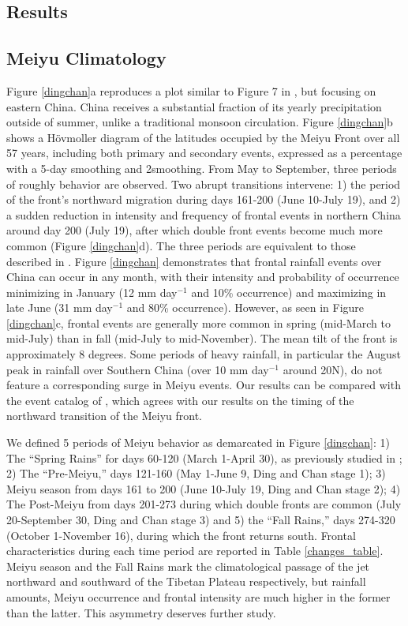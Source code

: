 \documentclass[draft,grl]{AGUTeX}
\begin{document}
\begin{article}
\section{Results}	
	
\subsection{Meiyu Climatology}	

	Figure \ref{dingchan}a reproduces a plot similar to Figure 7 in \citet{Ding2005}, but focusing on eastern China. China receives a substantial fraction of its yearly precipitation outside of summer, unlike a traditional monsoon circulation. Figure \ref{dingchan}b shows a H\"ovmoller diagram of the latitudes occupied by the Meiyu Front over all 57 years, including both primary and secondary events, expressed as a percentage with a 5-day smoothing and 2\textdegree smoothing. From May to September, three periods of roughly behavior are observed. Two abrupt transitions intervene: 1) the period of the front's northward migration during days 161-200 (June 10-July 19), and 2) a sudden reduction in intensity and frequency of frontal events in northern China around day 200 (July 19), after which double front events become much more common (Figure \ref{dingchan}d). The three periods are equivalent to those described in \citet{Ding2005}. Figure \ref{dingchan} demonstrates that frontal rainfall events over China can occur in any month, with their intensity and probability of occurrence minimizing in January (12 mm day$^{-1}$ and 10\% occurrence) and maximizing in late June (31 mm day$^{-1}$ and 80\% occurrence). However, as seen in Figure \ref{dingchan}c, frontal events are generally more common in spring (mid-March to mid-July) than in fall (mid-July to mid-November). The mean tilt of the front is approximately 8 degrees. Some periods of heavy rainfall, in particular the August peak in rainfall over Southern China (over 10 mm day$^{-1}$ around 20\textdegree N), do not feature a corresponding surge in Meiyu events. Our results can be compared with the event catalog of \citet{Xu2009}, which agrees with our results on the timing of the northward transition of the Meiyu front.
		
	We defined 5 periods of Meiyu behavior as demarcated in Figure \ref{dingchan}: 1) The ``Spring Rains'' for days 60-120 (March 1-April 30), as previously studied in \citet{Tian1998}; 2) The ``Pre-Meiyu,'' days 121-160 (May 1-June 9, Ding and Chan stage 1); 3) Meiyu season from days 161 to 200 (June 10-July 19, Ding and Chan stage 2); 4) The Post-Meiyu from days 201-273 during which double fronts are common (July 20-September 30, Ding and Chan stage 3) and 5) the ``Fall Rains,'' days 274-320 (October 1-November 16), during which the front returns south. Frontal characteristics during each time period are reported in Table \ref{changes_table}. Meiyu season and the Fall Rains mark the climatological passage of the jet northward and southward of the Tibetan Plateau respectively, but rainfall amounts, Meiyu occurrence and frontal intensity are much higher in the former than the latter. This asymmetry deserves further study.
		

\end{article}
\end{document}
